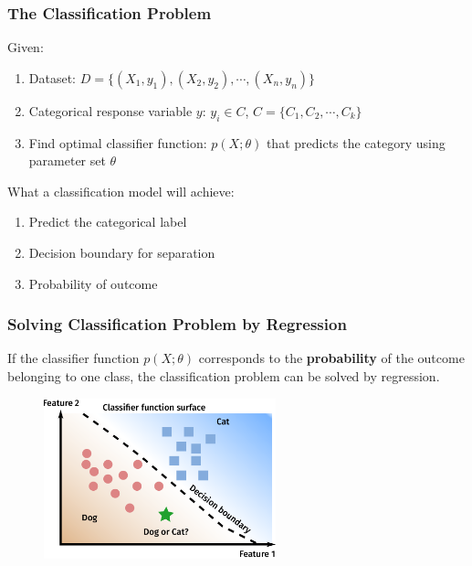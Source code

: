 \documentclass[10pt,aspectratio=169]{beamer}
\begin{document}
\begin{frame}
  \frametitle{The Classification Problem}

  Given:
  \begin{enumerate}
  \item Dataset: $D = \{(X_{1}, y_{1}), (X_{2},y_{2}), \cdots , (X_{n}, y_{n})\}$
  \item Categorical response variable $y$: $y_{i} \in C$, $C = \{C_{1}, C_{2}, \cdots, C_{k}\}$
    
\item Find optimal classifier function: $p(X; \theta)$ that predicts the category using parameter set $\theta$
  \end{enumerate}

  \vspace{2em}

  What a classification model will achieve:
    \begin{enumerate}
    \item Predict the categorical label
    \item Decision boundary for separation
    \item Probability of outcome
    \end{enumerate}
  
\end{frame}

\begin{frame}
  \frametitle{Solving Classification Problem by Regression}

  If the classifier function $p(X; \theta)$ corresponds to the
  \textbf{probability} of the outcome belonging to one class, the
  classification problem can be solved by regression.

  \vspace{2em}

  \begin{figure}[t]
    \vspace{-2em}
     \includegraphics[width=0.6\textwidth]{images/classification_dog_cat.pdf}
    \end{figure}
  
  \end{frame}
\end{document}
